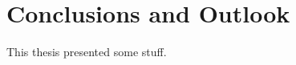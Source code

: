 \chapter{Conclusions and Outlook}\label{chap:conclusion}

This thesis presented some stuff.
\lipsum[9-15]
